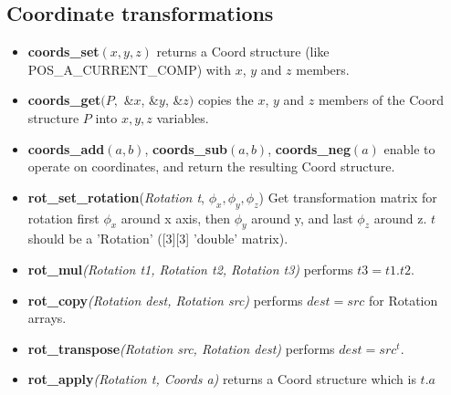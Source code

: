 \subsection{Coordinate transformations}
\begin{itemize}
\item \textbf{coords\_set}$(x,y,z)$ returns a Coord structure (like POS\_A\_CURRENT\_COMP) with $x$, $y$ and $z$ members.
\item \textbf{ coords\_get}$(P,$ \&$x$, \&$y$, \&$z)$ copies the $x$, $y$ and
$z$ members of the Coord structure $P$ into $x,y,z$ variables.
\item \textbf{coords\_add}$(a,b)$, \textbf{coords\_sub}$(a,b)$, \textbf{
coords\_neg}$(a)$ enable to  operate on coordinates, and return the
resulting Coord structure.
\item \textbf{rot\_set\_rotation}(\textit{Rotation t}, $\phi_x, \phi_y, \phi_z$)
  Get transformation matrix for rotation
  first $\phi_x$ around x axis, then $\phi_y$ around y,
  and last $\phi_z$ around z. $t$ should be a 'Rotation' ([3][3] 'double' matrix).
\item \textbf{rot\_mul}\textit{(Rotation t1, Rotation t2, Rotation t3)} performs $t3 = t1 . t2$.
\item \textbf{rot\_copy}\textit{(Rotation dest, Rotation src)} performs $dest = src$ for Rotation arrays.
\item \textbf{rot\_transpose}\textit{(Rotation src, Rotation dest)} performs $dest = src^t$.
\item \textbf{rot\_apply}\textit{(Rotation t, Coords a)} returns a Coord structure which is $t.a$
\end{itemize}

